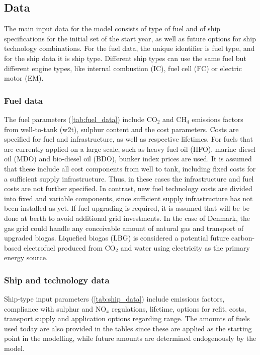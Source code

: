 \documentclass[article]{elsarticle}
\begin{document}
\glsdisablehyper
\glsaddall
\begin{table}[h]
\begin{mdframed}
\footnotesize{
\begin{multicols}{2}
\printglossary[style=tree,type=obj]
\end{multicols}
}
\end{mdframed}
\label{box:nomenclature_obj}
\end{table}



\subsection{Data}
\label{subsec:Dat}
The main input data for the model consists of type of fuel and of ship specifications for the initial set of the start year, as well as future options for ship technology combinations. For the fuel data, the unique identifier is fuel type, and for the ship data it is ship type. Different ship types can use the same fuel but different engine types, like internal combustion (IC), fuel cell (FC) or electric motor (EM).

\subsubsection{Fuel data}
The fuel parameters (\autoref{tab:fuel_data}) include CO$_2$ and CH$_4$ emissions factors from well-to-tank (w2t), sulphur content and the cost parameters. Costs are specified for fuel and infrastructure, as well as respective lifetimes. For fuels that are currently applied on a large scale, such as heavy fuel oil (HFO), marine diesel oil (MDO) and bio-diesel oil (BDO),  bunker index prices are used. It is assumed that these include all cost components from well to tank, including fixed costs for a sufficient supply infrastructure. Thus, in these cases the infrastructure and fuel costs are not further specified. In contrast, new fuel technology costs are divided into fixed and variable components, since sufficient supply infrastructure has not been installed as yet. If fuel upgrading is required, it is assumed that will be be done at berth to avoid additional grid investments. In the case of Denmark, the gas grid could handle any conceivable amount of natural gas and transport of upgraded biogas. Liquefied biogas (LBG) is considered a potential future carbon-based electrofuel produced from CO$_2$ and water using electricity as the primary energy source.


\subsubsection{Ship and technology data}
Ship-type input parameters (\autoref{tab:ship_data}) include emissions factors, compliance with sulphur and NO$_x$ regulations, lifetime, options for refit, costs, transport supply and application options regarding range. The amounts of fuels used today are also provided in the tables since these are applied as the starting point in the modelling, while future amounts are determined endogenously by the model.
\end{document}
